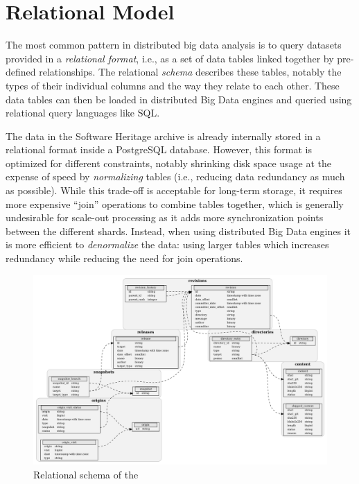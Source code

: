 \section{Relational Model}

The most common pattern in distributed big data analysis is to query datasets
provided in a \emph{relational format}, i.e., as a set of data tables linked
together by pre-defined relationships. The relational \emph{schema} describes
these tables, notably the types of their individual columns and the way they
relate to each other. These data tables can then be loaded in distributed Big
Data engines and queried using relational query languages like SQL.

The data in the Software Heritage archive is already internally stored in a
relational format inside a PostgreSQL database. However, this format is
optimized for different constraints, notably shrinking disk space usage at the
expense of speed by \emph{normalizing} tables (i.e., reducing data redundancy
as much as possible). While this trade-off is acceptable for long-term storage,
it requires more expensive ``join'' operations to combine tables together,
which is generally undesirable for scale-out processing as it adds more
synchronization points between the different shards. Instead, when using
distributed Big Data engines it is more efficient to \emph{denormalize} the
data: using larger tables which increases redundancy while reducing the need
for join operations.

\begin{figure}
    \includegraphics[width=\linewidth]{img/graph-dataset/db-schema}
    \caption{Relational schema of the \SWHGD{}}%
    \label{fig:swh-dataset-schema}
\end{figure}

